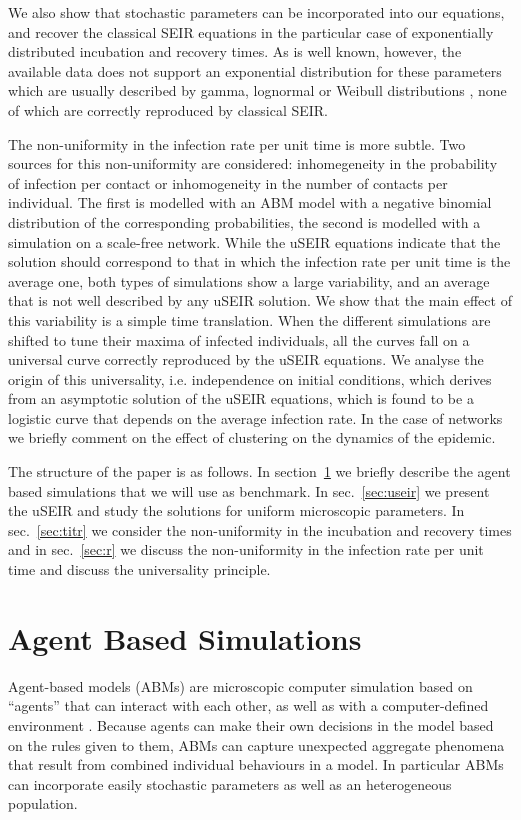 \documentclass[a4paper,oneside,11pt]{article}
\begin{document}
We also show that stochastic parameters can be incorporated into our equations, and recover the classical SEIR equations in the particular case of exponentially distributed incubation and recovery times. As is well known, however, the available data does not support an exponential distribution for these parameters which are usually described by gamma, lognormal or Weibull distributions \cite{Zhang2020, Hellewell2020}, none of which are correctly reproduced by classical SEIR.

The non-uniformity in the infection rate per unit time is more subtle. Two sources  for this non-uniformity are considered: inhomegeneity in the probability of infection per contact or inhomogeneity in the number of contacts per individual. The first is modelled with an ABM model with a negative binomial distribution of the corresponding probabilities, the second is modelled with a simulation on a scale-free network. While the uSEIR equations indicate that the solution should correspond to that in which the infection rate per unit time is the average one, both types of simulations show a large variability, and an average that is not well described by any uSEIR solution. We show that the main effect of this variability is a simple time translation. When the different simulations are shifted to tune their maxima of infected individuals, all the curves fall on a universal curve correctly reproduced by the uSEIR equations. We analyse the origin of this universality, i.e. independence on initial conditions, which derives from an asymptotic solution of the uSEIR equations, which is found to be a logistic curve that depends on the average infection rate. In the case of networks we briefly comment on the effect of clustering on the dynamics of the epidemic. 

The structure of the paper is as follows. In section~\ref{sec:ABM} we briefly describe the agent based simulations that we will use as benchmark.
In sec.~\ref{sec:useir} we present the uSEIR and study the solutions for uniform microscopic parameters. In sec.~\ref{sec:titr} we consider the
non-uniformity in the incubation and recovery times and in sec.~\ref{sec:r} we discuss the non-uniformity in the infection rate per unit time and discuss the universality principle.

\section{Agent Based Simulations}
\label{sec:ABM}

Agent-based models (ABMs) are microscopic computer simulation based on ``agents'' that can interact with each other, as well as with a computer-defined environment \cite{Hunter2017}. Because agents can make their own decisions in the model based on the rules given to them, ABMs can capture unexpected aggregate phenomena that result from combined individual behaviours in a model. In particular ABMs can incorporate easily stochastic parameters as well as an heterogeneous population.
\end{document}
